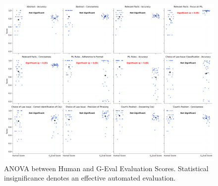 \documentclass[a4paper,12pt]{article}
\begin{document}
\begin{figure}[htp]
\centering
\includegraphics[width=14cm]{metric_anova_comparison.png}
\caption{ANOVA between Human and G-Eval Evaluation Scores. Statistical insignificance denotes an effective automated evaluation.}
\label{fig:image}
\end{figure}
\end{document}
